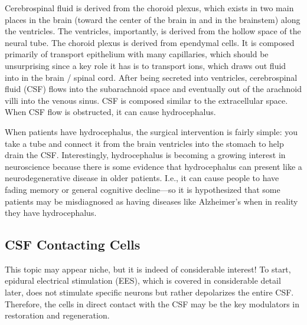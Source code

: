 Cerebrospinal fluid is derived from the choroid plexus, which exists in two main places in the brain (toward the center of the brain in and in the brainstem) along the ventricles. The ventricles, importantly, is derived from the hollow space of the neural tube. The choroid plexus is derived from ependymal cells. It is composed primarily of transport epithelium with many capillaries, which should be unsurprising since a key role it has is to transport ions, which draws out fluid into in the brain / spinal cord. After being secreted into ventricles, cerebrospinal fluid (CSF) flows into the subarachnoid space and eventually out of the arachnoid villi into the venous sinus. CSF is composed similar to the extracellular space. When CSF flow is obstructed, it can cause hydrocephalus.\newline

When patients have hydrocephalus, the surgical intervention is fairly simple: you take a tube and connect it from the brain ventricles into the stomach to help drain the CSF. Interestingly, hydrocephalus is becoming a growing interest in neuroscience because there is some evidence that hydrocephalus can present like a neurodegenerative disease in older patients. I.e., it can cause people to have fading memory or general cognitive decline---so it is hypothesized that some patients may be misdiagnosed as having diseases like Alzheimer's when in reality they have hydrocephalus.


\subsection{CSF Contacting Cells}

This topic may appear niche, but it is indeed of considerable interest! To start, epidural electrical stimulation (EES), which is covered in considerable detail later, does not stimulate specific neurons but rather depolarizes the entire CSF. Therefore, the cells in direct contact with the CSF may be the key modulators in restoration and regeneration.\newline

